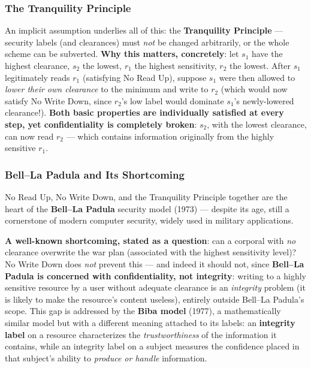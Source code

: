 \documentclass[12pt, a4paper]{article}
\begin{document}
\subsubsection{The Tranquility Principle}
An implicit assumption underlies all of this: the \textbf{Tranquility Principle} --- security labels (and clearances) must \emph{not} be changed arbitrarily, or the whole scheme can be subverted. \textbf{Why this matters, concretely}: let $s_1$ have the highest clearance, $s_2$ the lowest, $r_1$ the highest sensitivity, $r_2$ the lowest. After $s_1$ legitimately reads $r_1$ (satisfying No Read Up), suppose $s_1$ were then allowed to \emph{lower their own clearance} to the minimum and write to $r_2$ (which would now satisfy No Write Down, since $r_2$'s low label would dominate $s_1$'s newly-lowered clearance!). \textcolor{red!70!black}{\textbf{Both basic properties are individually satisfied at every step, yet confidentiality is completely broken}}: $s_2$, with the lowest clearance, can now read $r_2$ --- which contains information originally from the highly sensitive $r_1$.

\subsubsection{Bell--La Padula and Its Shortcoming}
No Read Up, No Write Down, and the Tranquility Principle together are the heart of the \textbf{Bell--La Padula} security model (1973) --- despite its age, still a cornerstone of modern computer security, widely used in military applications.

\textcolor{ForestGreen!60!black}{\textbf{A well-known shortcoming, stated as a question}}: can a corporal with \emph{no} clearance overwrite the war plan (associated with the highest sensitivity level)? No Write Down does \emph{not} prevent this --- and indeed it should not, since \textbf{Bell--La Padula is concerned with confidentiality, not integrity}: writing to a highly sensitive resource by a user without adequate clearance is an \emph{integrity} problem (it is likely to make the resource's content useless), entirely outside Bell--La Padula's scope. This gap is addressed by the \textbf{Biba model} (1977), a mathematically similar model but with a different meaning attached to its labels: an \textbf{integrity label} on a resource characterizes the \emph{trustworthiness} of the information it contains, while an integrity label on a subject measures the confidence placed in that subject's ability to \emph{produce or handle} information.
\end{document}
